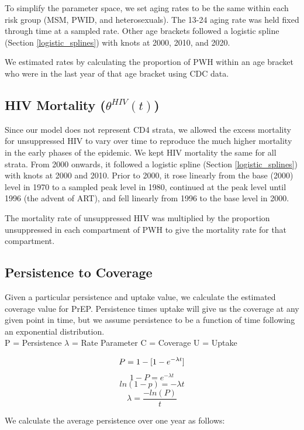 \documentclass{article}
\begin{document}
To simplify the parameter space, we set aging rates to be the same within each risk group (MSM, PWID, and heterosexuals). The 13-24 aging rate was held fixed through time at a sampled rate. Other age brackets followed a logistic spline (Section \ref{logistic_splines}) with knots at 2000, 2010, and 2020.

We estimated rates by calculating the proportion of PWH within an age bracket who were in the last year of that age bracket using CDC data.

\subsection{HIV Mortality \big($\theta^{HIV}(t)$\big)}\label{mortality}

Since our model does not represent CD4 strata, we allowed the excess mortality for unsuppressed HIV to vary over time to reproduce the much higher mortality in the early phases of the epidemic. We kept HIV mortality the same for all strata. From 2000 onwards, it followed a logistic spline (Section \ref{logistic_splines}) with knots at 2000 and 2010. Prior to 2000, it rose linearly from the base (2000) level in 1970 to a sampled peak level in 1980, continued at the peak level until 1996 (the advent of ART), and fell linearly from 1996 to the base level in 2000.

The mortality rate of unsuppressed HIV was multiplied by the proportion unsuppressed in each compartment of PWH to give the mortality rate for that compartment.

\subsection{Persistence to Coverage}

Given a particular persistence and uptake value, we calculate the estimated coverage value for PrEP. Persistence times uptake will give us the coverage at any given point in time, but we assume persistence to be a function of time following an exponential distribution. \\


P = Persistence 
$\lambda$ = Rate Parameter 
C = Coverage
U = Uptake 



\[
P = 1 - [1 - e^{-\lambda t}] \\
\]
\[
1- P = e^{-\lambda t} 
\]
\[
ln(1-p) = -\lambda t  
\]
\[
 \lambda = \dfrac{-ln(P)}{t} \]


We calculate the average persistence over one year as follows:
\end{document}
